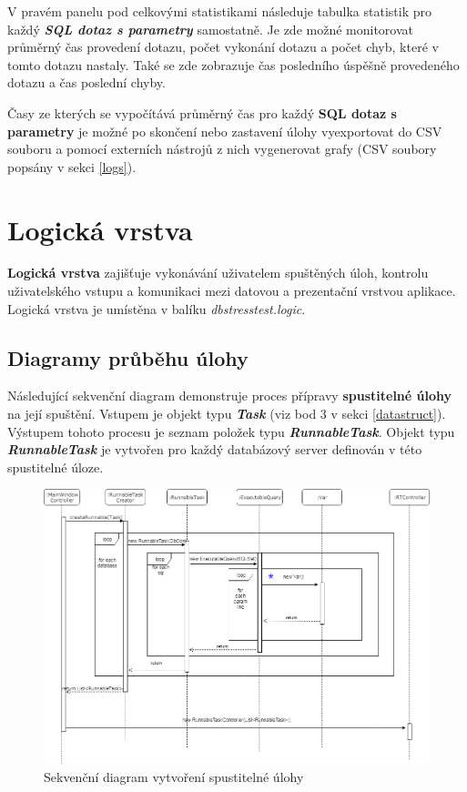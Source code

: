 \documentclass[czech,bachelor,public,dept460,male,cpdeclaration,twoside]{diploma}
\begin{document}
V pravém panelu pod celkovými statistikami následuje tabulka statistik pro každý \textbf{\emph{SQL dotaz s parametry}} samostatně. Je zde možné monitorovat průměrný čas provedení dotazu, počet vykonání dotazu a počet chyb, které v tomto dotazu nastaly. Také se zde zobrazuje čas posledního úspěšně provedeného dotazu a čas poslední chyby.

Časy ze kterých se vypočítává průměrný čas pro každý \textbf{SQL dotaz s parametry} je možné po skončení nebo zastavení úlohy vyexportovat do CSV souboru a pomocí externích nástrojů z nich vygenerovat grafy (CSV soubory popsány v sekci \ref{logs}).



\newpage
\section{Logická vrstva} \label{logiclayer}
\textbf{Logická vrstva} zajišťuje vykonávání uživatelem spuštěných úloh, kontrolu uživatelského vstupu a komunikaci mezi datovou a prezentační vrstvou aplikace. Logická vrstva je umístěna v balíku \textit{dbstresstest.logic}.
\subsection{Diagramy průběhu úlohy} \label{logic}
Následující sekvenční diagram demonstruje proces přípravy \textbf{spustitelné úlohy} na její spuštění. Vstupem je objekt typu \textbf{\emph{Task}} (viz bod 3 v sekci \ref{datastruct}). Výstupem tohoto procesu je seznam položek typu \textbf{\emph{RunnableTask}}. Objekt typu \textbf{\emph{RunnableTask}} je vytvořen pro každý databázový server definován v této spustitelné úloze.

\begin{figure}[!htbp]\centering\includegraphics[width=1.0\textwidth]{Figures/rtprocess.png}\caption{Sekvenční diagram vytvoření spustitelné úlohy}
\label{seq1}
\end{figure}
\end{document}
